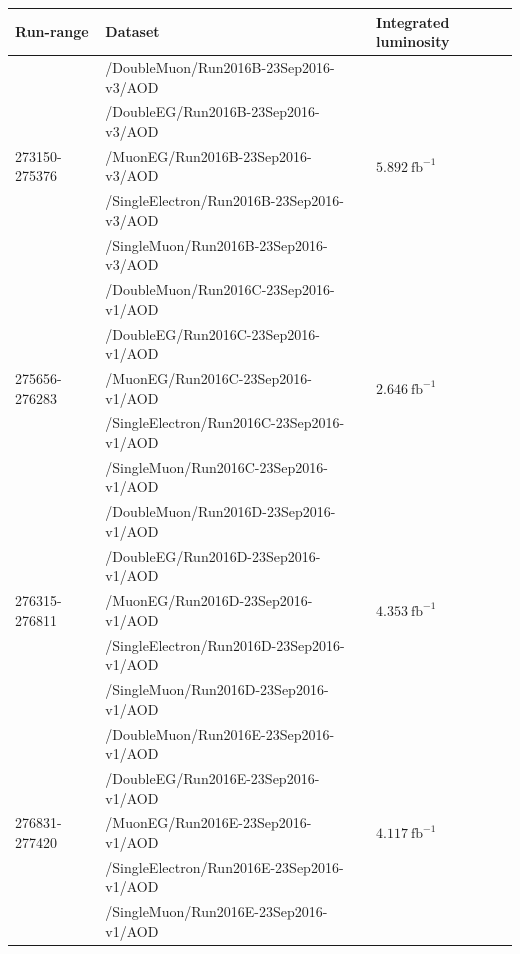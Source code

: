 \begin{table}[h]
\tiny
    \centering
    \begin{tabular}{|l|l|l|} 
\hline %
\hline %
Run-range & Dataset & Integrated luminosity \\
\hline %
\hline %
\multirow{5}{*}{273150-275376} & /DoubleMuon/Run2016B-23Sep2016-v3/AOD &  \multirow{5}{*}{$5.892\ \text{fb}^{-1}$} \\ 
& /DoubleEG/Run2016B-23Sep2016-v3/AOD &  \\ 
& /MuonEG/Run2016B-23Sep2016-v3/AOD &  \\ 
& /SingleElectron/Run2016B-23Sep2016-v3/AOD &  \\ 
& /SingleMuon/Run2016B-23Sep2016-v3/AOD &  \\ 
\hline
\multirow{5}{*}{275656-276283} & /DoubleMuon/Run2016C-23Sep2016-v1/AOD &  \multirow{5}{*}{$2.646\ \text{fb}^{-1}$}  \\ 
& /DoubleEG/Run2016C-23Sep2016-v1/AOD &  \\ 
& /MuonEG/Run2016C-23Sep2016-v1/AOD &  \\ 
& /SingleElectron/Run2016C-23Sep2016-v1/AOD &  \\ 
& /SingleMuon/Run2016C-23Sep2016-v1/AOD &  \\ 
\hline
\multirow{5}{*}{276315-276811} & /DoubleMuon/Run2016D-23Sep2016-v1/AOD &  \multirow{5}{*}{$4.353\ \text{fb}^{-1}$} \\ 
& /DoubleEG/Run2016D-23Sep2016-v1/AOD &  \\ 
& /MuonEG/Run2016D-23Sep2016-v1/AOD &  \\ 
& /SingleElectron/Run2016D-23Sep2016-v1/AOD &  \\ 
& /SingleMuon/Run2016D-23Sep2016-v1/AOD &  \\ 
\hline
\multirow{5}{*}{276831-277420} & /DoubleMuon/Run2016E-23Sep2016-v1/AOD &  \multirow{5}{*}{$4.117\ \text{fb}^{-1}$} \\ 
& /DoubleEG/Run2016E-23Sep2016-v1/AOD &  \\ 
& /MuonEG/Run2016E-23Sep2016-v1/AOD &  \\ 
& /SingleElectron/Run2016E-23Sep2016-v1/AOD &  \\ 
& /SingleMuon/Run2016E-23Sep2016-v1/AOD &  \\ 

\end{tabular}
\end{table}
